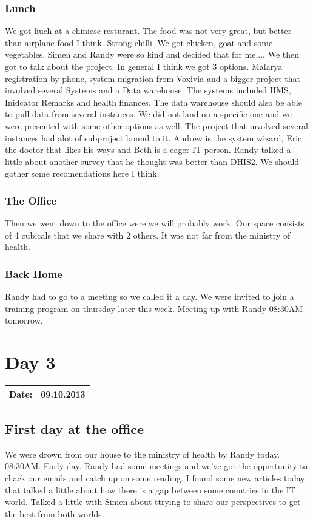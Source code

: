 \subsubsection{Lunch}
We got liuch at a chiniese resturant. The food was not very great, but better than airplane food I think. Strong chilli. We got chicken, goat and some vegetables.
Simen and Randy were so kind and decided that for me.... 
We then got to talk about the project. In general I think we got 3 options.
Malarya registration by phone, system migration from Voxivia and a bigger project that involved several Systems and a Data warehouse.
The systems included HMS, Inidcator Remarks and health finances. The data warehouse should also be able to pull data from several instances.
We did not land on a specific one and we were presented with some other options as well.
The project that involved several instances had alot of subproject bound to it.
Andrew is the system wizard, Eric the doctor that likes his ways and Beth is a eager IT-person.
Randy talked a little about another survey that he thought was better than DHIS2. We should gather some recomendations here I think.
\subsubsection{The Office}
Then we went down to the office were we will probably work. Our space consists of 4 cubicals that we share with 2 others.
It was not far from the ministry of health.
\subsubsection{Back Home}
Randy had to go to a meeting so we called it a day. We were invited to join a training program on thursday later this week. Meeting up with Randy 08:30AM tomorrow.
\section{Day 3}
\begin{tabular}{|c|c|}
\hline
Date: & 09.10.2013 \\
\hline
\end{tabular}
\subsection{First day at the office}
We were drown from our house to the ministry of health by Randy today. 08:30AM. Early day. Randy had some meetings and we've got the oppertunity to chack our emails and catch up on some reading. I found some new articles today that talked a little about how there is a gap between some countries in the IT world. Talked a little with Simen about ttrying to share our perspectives to get the best from both worlds.
